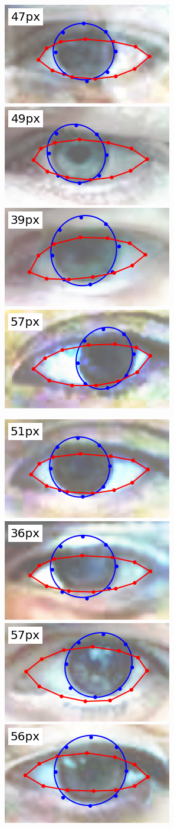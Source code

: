 \begin{figure}
    \centering
    \includegraphics[width=0.244\columnwidth]{figs/ldmks_examples/idx_0.png}\hfill
    \includegraphics[width=0.244\columnwidth]{figs/ldmks_examples/idx_55.png}\hfill
    \includegraphics[width=0.244\columnwidth]{figs/ldmks_examples/idx_160.png}\hfill
    \includegraphics[width=0.244\columnwidth]{figs/ldmks_examples/idx_12.png}
    \par \vspace{0.1em}
    \includegraphics[width=0.244\columnwidth]{figs/ldmks_examples/idx_35.png}\hfill
    \includegraphics[width=0.244\columnwidth]{figs/ldmks_examples/idx_145.png}\hfill
    \includegraphics[width=0.244\columnwidth]{figs/ldmks_examples/idx_171.png}\hfill
    \includegraphics[width=0.244\columnwidth]{figs/ldmks_examples/idx_113.png}

\end{figure}
